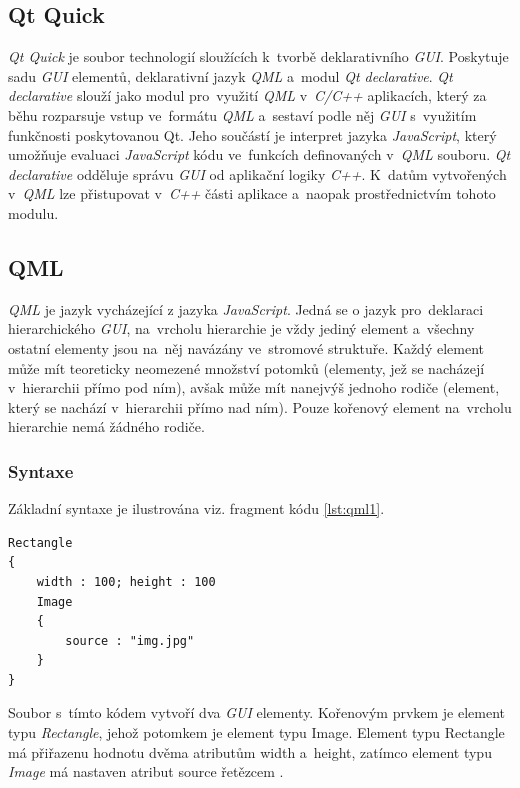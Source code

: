 \documentclass[11pt,twoside,a4paper]{book}
\begin{document}
\subsection{Qt Quick}
\textit{Qt Quick} je soubor technologií sloužících k~tvorbě deklarativního \textit{GUI}. Poskytuje sadu \textit{GUI} elementů, deklarativní jazyk \textit{QML} a~modul \textit{Qt declarative}. \textit{Qt declarative} slouží jako modul pro~využití \textit{QML} v~\textit{C/C++} aplikacích, který za běhu rozparsuje vstup ve~formátu \textit{QML} a~sestaví podle něj \textit{GUI} s~využitím funkčnosti poskytovanou Qt. Jeho součástí je interpret jazyka \textit{JavaScript}, který umožňuje evaluaci \textit{JavaScript} kódu ve~funkcích definovaných v~\textit{QML} souboru. \textit{Qt declarative} odděluje správu \textit{GUI} od aplikační logiky \textit{C++}. K~datům vytvořených v~\textit{QML} lze přistupovat v~\textit{C++} části aplikace a~naopak prostřednictvím tohoto modulu. \cite{bib:QtQuick}

\subsection{QML}
\textit{QML} je jazyk vycházející z jazyka \textit{JavaScript}. Jedná se o jazyk pro~deklaraci hierarchického \textit{GUI}, na~vrcholu hierarchie je vždy jediný element a~všechny ostatní elementy jsou na~něj navázány ve~stromové struktuře. Každý element může mít teoreticky neomezené množství potomků (elementy, jež se nacházejí v~hierarchii přímo pod ním), avšak může mít nanejvýš jednoho rodiče (element, který se nachází v~hierarchii přímo nad ním). Pouze kořenový element na~vrcholu hierarchie nemá žádného rodiče. \cite{bib:QML}

\subsubsection{Syntaxe}
Základní syntaxe je ilustrována viz. fragment kódu \ref{lst:qml1}.
\begin{lstlisting}[float,frame=single,caption=Tvorba dvou jednoduchých elementů pomocí jazyka \textit{QML}.,label=Tvorba dvou jednoduchých elementů pomocí jazyka \textit{QML}.,label=lst:qml1]
Rectangle
{
	width : 100; height : 100
	Image
	{
		source : "img.jpg"
	}
}
\end{lstlisting}
Soubor s~tímto kódem vytvoří dva \textit{GUI} elementy. Kořenovým prvkem je element typu \textit{Rectangle}, jehož potomkem je element typu Image. Element typu Rectangle má přiřazenu hodnotu dvěma atributům width a~height, zatímco element typu \textit{Image} má nastaven atribut source řetězcem .
\end{document}
